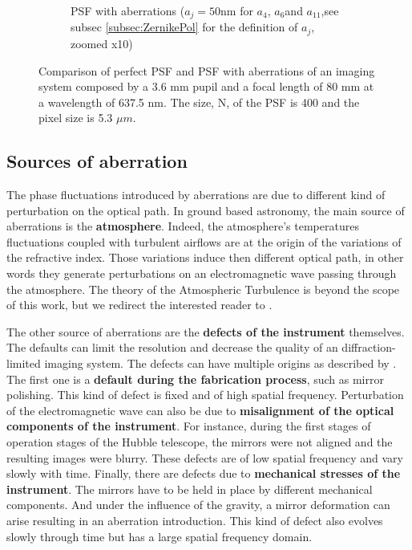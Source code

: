 \begin{figure}
\begin{subfigure}{0.4\textwidth}
         \caption{PSF with aberrations ($a_j = 50 \mathrm{nm}$ for $a_{4}$, $a_{6}$and $a_{11}$,see subsec \ref{subsec:ZernikePol} for the definition of $a_j$, zoomed x10)}
         \label{subfig:PSFWthAb}
     \end{subfigure}
     \decoRule
     \caption{Comparison of perfect PSF and PSF with aberrations of an imaging system composed by a 3.6 mm pupil and a focal length of 80 mm at a wavelength of 637.5 nm. The size, N, of the PSF is 400 and the pixel size is 5.3 $\mu m$.}
     \label{fig:ComparisonPSFs}
 \end{figure} 

\subsection{Sources of aberration}
\label{subsec:SourcesAb}

The phase fluctuations introduced by aberrations are due to different kind of perturbation on the optical path. In ground based astronomy, the main source of aberrations is the \textbf{atmosphere}. Indeed, the atmosphere's temperatures fluctuations coupled with turbulent airflows are at the origin of the variations of the refractive index. Those variations induce then different optical path, in other words they generate perturbations on an electromagnetic wave passing through the atmosphere. The theory of the Atmospheric Turbulence is beyond the scope of this work, but we redirect the interested reader to \citet{obukhov1949,Tatarski1961,kolmogorov1968}.

The other source of aberrations are the \textbf{defects of the instrument} themselves. The defaults can limit the resolution and decrease the quality of an diffraction-limited imaging system. The defects can have multiple origins as described by \citet{Blanc2002}. The first one is a \textbf{default during the fabrication process}, such as mirror polishing. This kind of defect is fixed and of high spatial frequency. Perturbation of the electromagnetic wave can also be due to \textbf{misalignment of the optical components of the instrument}. For instance, during the first stages of operation stages of the Hubble telescope, the mirrors were not aligned and the resulting images were blurry. These defects are of low spatial frequency and vary slowly with time. Finally, there are defects due to \textbf{mechanical stresses of the instrument}. The mirrors have to be held in place by different mechanical components. And under the influence of the gravity, a mirror deformation can arise resulting in an aberration introduction. This kind of defect also evolves slowly through time but has a large spatial frequency domain.

